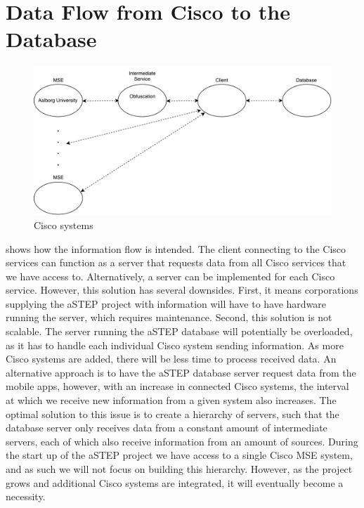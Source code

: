 \section{Data Flow from Cisco to the Database}\label{sec:data_flow}
\begin{figure}[ht]
	\begin{center}
		\includegraphics[scale=0.7]{graphics/ciscoNew.pdf}
		\caption{Cisco systems}
		\label{fig:cisco_systems}
	\end{center} 
\end{figure}
 shows how the information flow is intended. The client connecting to the Cisco services can function as a server that requests data from all Cisco services that we have access to. Alternatively, a server can be implemented for each Cisco service. However, this solution has several downsides. First, it means corporations supplying the aSTEP project with information will have to have hardware running the server, which requires maintenance. Second, this solution is not scalable. The server running the aSTEP database will potentially be overloaded, as it has to handle each individual Cisco system sending information. As more Cisco systems are added, there will be less time to process received data. An alternative approach is to have the aSTEP database server request data from the mobile apps, however, with an increase in connected Cisco systems, the interval at which we receive new information from a given system also increases. The optimal solution to this issue is to create a hierarchy of servers, such that the database server only receives data from a constant amount of intermediate servers, each of which also receive information from an amount of sources. During the start up of the aSTEP project we have access to a single Cisco MSE system, and as such we will not focus on building this hierarchy. However, as the project grows and additional Cisco systems are integrated, it will eventually become a necessity.

 



